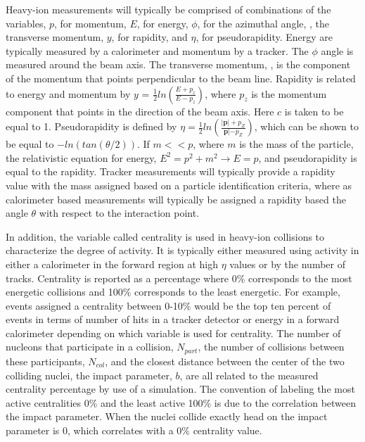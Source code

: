     Heavy-ion measurements will typically be comprised of 
      combinations of the variables, $p$, for momentum, $E$, for energy, 
      $\phi$, for the azimuthal angle, \pt, the transverse momentum, $y$, 
      for rapidity, and $\eta$, for pseudorapidity. 
    Energy are typically measured by a calorimeter and momentum by a tracker.
    The $\phi$ angle is measured around the beam axis. 
    The transverse momentum, \pt, is the component of the momentum that points
      perpendicular to the beam line. 
    Rapidity is related to energy and momentum by 
    $y$ = $\frac{1}{2}ln\left(\frac{E+p_{z}}{E-p_{z}}\right)$, where $p_{z}$ 
      is the momentum component that points in the direction of the beam axis. 
    Here $c$ is taken to be equal to 1. 
    Pseudorapidity is defined by
      $\eta=\frac{1}{2}ln\left(\frac{|\mathbf{p}|+p_{Z}}{\mathbf{p}|-p_{Z}}\right)$, 
      which can be shown to be equal to $-ln\left(tan\left(\theta/2\right)\right)$.
    If $m << p$, where $m$ is the mass of the particle, the 
      relativistic equation for energy, $E^2=p^2+m^2 \rightarrow E=p$, and 
      pseudorapidity is equal to the rapidity. 
    Tracker measurements will typically provide a rapidity value with 
      the mass assigned based on a particle identification criteria, where as 
      calorimeter based measurements will typically be assigned a rapidity 
      based the angle $\theta$ with respect to the interaction point.

    In addition, the variable called centrality is used in heavy-ion 
      collisions to characterize the degree of activity. 
    It is typically either measured using activity in either a calorimeter in
      the forward region at high $\eta$ values or by the number of tracks.
    Centrality is reported as a percentage where 0\% corresponds to the most 
      energetic collisions and 100\% corresponds to the least energetic.
    For example, events assigned a centrality between 0-10\% would be the 
      top ten percent of events in terms of number of hits in a tracker 
      detector or energy in a forward calorimeter depending on which 
      variable is used for centrality. 
    The number of nucleons that participate in a collision, $N_{part}$,
      the number of collisions between these participants, $N_{col}$, and the
      closest distance between the center of the two colliding nuclei, the 
      impact parameter, $b$, are all related to the measured centrality 
      percentage by use of a simulation. 
    The convention of labeling the most active centralities 0\% and the least
      active 100\% is due to the correlation between the impact parameter.
    When the nuclei collide exactly head on the impact parameter is 0, which 
      correlates with a 0\% centrality value. 

